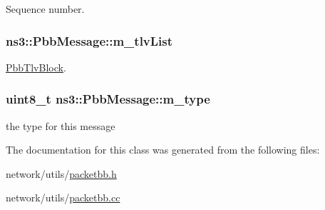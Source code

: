 Sequence number. 

\subsubsection[{\texorpdfstring{m\+\_\+tlv\+List}{m_tlvList}}]{ ns3\+::\+Pbb\+Message\+::m\+\_\+tlv\+List\hspace{0.3cm}{\ttfamily [private]}}\hypertarget{classns3_1_1PbbMessage_a9cb5f9be8bab80d5f7fc47338425c072}{}\label{classns3_1_1PbbMessage_a9cb5f9be8bab80d5f7fc47338425c072}


\hyperlink{classns3_1_1PbbTlvBlock}{Pbb\+Tlv\+Block}. 

\subsubsection[{\texorpdfstring{m\+\_\+type}{m_type}}]{\setlength{\rightskip}{0pt plus 5cm}uint8\+\_\+t ns3\+::\+Pbb\+Message\+::m\+\_\+type\hspace{0.3cm}{\ttfamily [private]}}\hypertarget{classns3_1_1PbbMessage_afb41a4f87baf9e01a9fe825a6f012691}{}\label{classns3_1_1PbbMessage_afb41a4f87baf9e01a9fe825a6f012691}


the type for this message 



The documentation for this class was generated from the following files\+:\begin{DoxyCompactItemize}
\item 
network/utils/\hyperlink{packetbb_8h}{packetbb.\+h}\item 
network/utils/\hyperlink{packetbb_8cc}{packetbb.\+cc}\end{DoxyCompactItemize}
